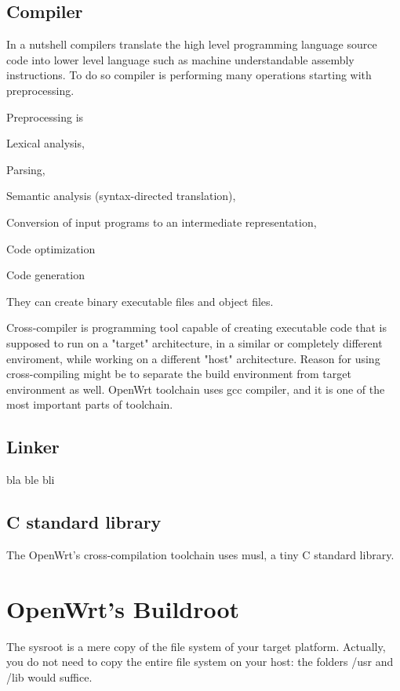 \subsection{Compiler}

In a nutshell compilers translate the high level programming language source code into lower level language such as machine understandable assembly instructions.
To do so compiler is performing many operations starting with preprocessing.

Preprocessing is

Lexical analysis,

Parsing,

Semantic analysis (syntax-directed translation),

Conversion of input programs to an intermediate representation,

Code optimization

Code generation

They can create binary executable files and object files.

Cross-compiler is programming tool capable of creating executable code that is supposed to run on a "target" architecture, in a similar or completely different enviroment, while working on a different "host" architecture.
Reason for using cross-compiling might be to separate the build environment from target environment as well.
OpenWrt toolchain uses gcc compiler, and it is one of the most important parts of toolchain.

\subsection{Linker}

bla ble bli

\subsection{C standard library}

The OpenWrt's cross-compilation toolchain uses musl, a tiny C standard library.

\section{OpenWrt's Buildroot}

The sysroot is a mere copy of the file system of your target platform.
Actually, you do not need to copy the entire file system on your host: the folders /usr and /lib would suffice.

